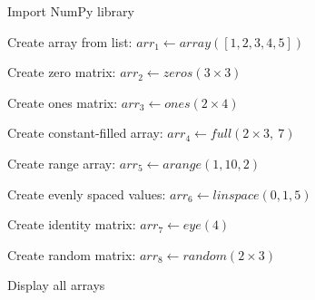 \begin{algorithm}
\caption{NumPy Array Creation Functions and Their Outputs}
\begin{algorithmic}[1]

\STATE Import NumPy library

\STATE Create array from list:
\STATE $arr_1 \gets array([1,2,3,4,5])$

\STATE Create zero matrix:
\STATE $arr_2 \gets zeros(3 \times 3)$

\STATE Create ones matrix:
\STATE $arr_3 \gets ones(2 \times 4)$

\STATE Create constant-filled array:
\STATE $arr_4 \gets full(2 \times 3,\ 7)$

\STATE Create range array:
\STATE $arr_5 \gets arange(1, 10, 2)$

\STATE Create evenly spaced values:
\STATE $arr_6 \gets linspace(0, 1, 5)$

\STATE Create identity matrix:
\STATE $arr_7 \gets eye(4)$

\STATE Create random matrix:
\STATE $arr_8 \gets random(2 \times 3)$

\STATE Display all arrays

\end{algorithmic}
\end{algorithm}